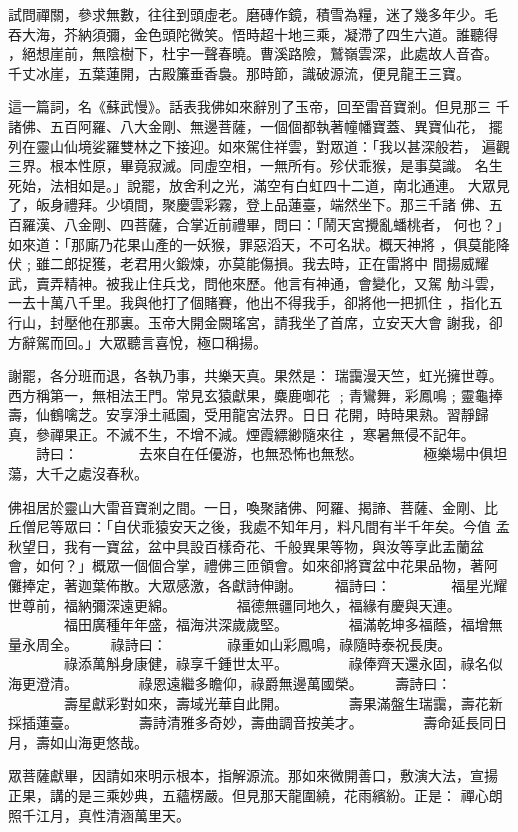 \begin{pinyinscope}
{試問禪關，參求無數，往往到頭虛老。磨磚作鏡，積雪為糧，迷了幾多年少。毛
吞大海，芥納須彌，金色頭陀微笑。悟時超十地三乘，凝滯了四生六道。誰聽得
，絕想崖前，無陰樹下，杜宇一聲春曉。曹溪路險，鷲嶺雲深，此處故人音杳。
千丈冰崖，五葉蓮開，古殿簾垂香裊。那時節，識破源流，便見龍王三寶。

這一篇詞，名《蘇武慢》。話表我佛如來辭別了玉帝，回至雷音寶剎。但見那三
千諸佛、五百阿羅、八大金剛、無邊菩薩，一個個都執著幢幡寶蓋、異寶仙花，
擺列在靈山仙境娑羅雙林之下接迎。如來駕住祥雲，對眾道：「我以甚深般若，
遍觀三界。根本性原，畢竟寂滅。同虛空相，一無所有。殄伏乖猴，是事莫識。
名生死始，法相如是。」說罷，放舍利之光，滿空有白虹四十二道，南北通連。
大眾見了，皈身禮拜。少頃間，聚慶雲彩霧，登上品蓮臺，端然坐下。那三千諸
佛、五百羅漢、八金剛、四菩薩，合掌近前禮畢，問曰：「鬧天宮攪亂蟠桃者，
何也？」如來道：「那廝乃花果山產的一妖猴，罪惡滔天，不可名狀。概天神將
，俱莫能降伏﹔雖二郎捉獲，老君用火鍛煉，亦莫能傷損。我去時，正在雷將中
間揚威耀武，賣弄精神。被我止住兵戈，問他來歷。他言有神通，會變化，又駕
觔斗雲，一去十萬八千里。我與他打了個賭賽，他出不得我手，卻將他一把抓住
，指化五行山，封壓他在那裏。玉帝大開金闕瑤宮，請我坐了首席，立安天大會
謝我，卻方辭駕而回。」大眾聽言喜悅，極口稱揚。

謝罷，各分班而退，各執乃事，共樂天真。果然是：
瑞靄漫天竺，虹光擁世尊。西方稱第一，無相法王門。常見玄猿獻果，麋鹿啣花
﹔青鸞舞，彩鳳鳴﹔靈龜捧壽，仙鶴噙芝。安享淨土祗園，受用龍宮法界。日日
花開，時時果熟。習靜歸真，參禪果正。不滅不生，不增不減。煙霞縹緲隨來往
，寒暑無侵不記年。
　　詩曰：
　　　　去來自在任優游，也無恐怖也無愁。
　　　　極樂場中俱坦蕩，大千之處沒春秋。

佛祖居於靈山大雷音寶剎之間。一日，喚聚諸佛、阿羅、揭諦、菩薩、金剛、比
丘僧尼等眾曰：「自伏乖猿安天之後，我處不知年月，料凡間有半千年矣。今值
孟秋望日，我有一寶盆，盆中具設百樣奇花、千般異果等物，與汝等享此盂蘭盆
會，如何？」概眾一個個合掌，禮佛三匝領會。如來卻將寶盆中花果品物，著阿
儺捧定，著迦葉佈散。大眾感激，各獻詩伸謝。
　　福詩曰：
　　　　福星光耀世尊前，福納彌深遠更綿。
　　　　福德無疆同地久，福緣有慶與天連。
　　　　福田廣種年年盛，福海洪深歲歲堅。
　　　　福滿乾坤多福蔭，福增無量永周全。
　　祿詩曰：
　　　　祿重如山彩鳳鳴，祿隨時泰祝長庚。
　　　　祿添萬斛身康健，祿享千鍾世太平。
　　　　祿俸齊天還永固，祿名似海更澄清。
　　　　祿恩遠繼多瞻仰，祿爵無邊萬國榮。
　　壽詩曰：
　　　　壽星獻彩對如來，壽域光華自此開。
　　　　壽果滿盤生瑞靄，壽花新採插蓮臺。
　　　　壽詩清雅多奇妙，壽曲調音按美才。
　　　　壽命延長同日月，壽如山海更悠哉。

眾菩薩獻畢，因請如來明示根本，指解源流。那如來微開善口，敷演大法，宣揚
正果，講的是三乘妙典，五蘊楞嚴。但見那天龍圍繞，花雨繽紛。正是：
禪心朗照千江月，真性清涵萬里天。

}
\end{pinyinscope}
